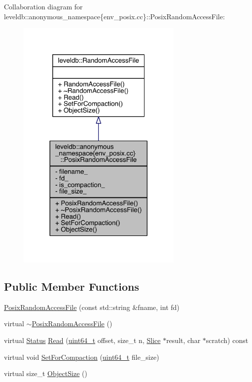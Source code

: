 Collaboration diagram for leveldb\+:\+:anonymous\+\_\+namespace\{env\+\_\+posix.\+cc\}\+:\+:Posix\+Random\+Access\+File\+:
\nopagebreak
\begin{figure}[H]
\begin{center}
\leavevmode
\includegraphics[width=228pt]{classleveldb_1_1anonymous__namespace_02env__posix_8cc_03_1_1_posix_random_access_file__coll__graph}
\end{center}
\end{figure}
\subsection*{Public Member Functions}
\begin{DoxyCompactItemize}
\item 
\hyperlink{classleveldb_1_1anonymous__namespace_02env__posix_8cc_03_1_1_posix_random_access_file_a59fbba60d64a0733967e370c0237144a}{Posix\+Random\+Access\+File} (const std\+::string \&fname, int fd)
\item 
virtual \hyperlink{classleveldb_1_1anonymous__namespace_02env__posix_8cc_03_1_1_posix_random_access_file_a679f35477f50752a92ed197fab3ca0bf}{$\sim$\+Posix\+Random\+Access\+File} ()
\item 
virtual \hyperlink{classleveldb_1_1_status}{Status} \hyperlink{classleveldb_1_1anonymous__namespace_02env__posix_8cc_03_1_1_posix_random_access_file_aca2f648930eefae81b23140cd69594c2}{Read} (\hyperlink{stdint_8h_aaa5d1cd013383c889537491c3cfd9aad}{uint64\+\_\+t} offset, size\+\_\+t n, \hyperlink{classleveldb_1_1_slice}{Slice} $\ast$result, char $\ast$scratch) const 
\item 
virtual void \hyperlink{classleveldb_1_1anonymous__namespace_02env__posix_8cc_03_1_1_posix_random_access_file_a9c28ba81aa49096f0722a78751807afd}{Set\+For\+Compaction} (\hyperlink{stdint_8h_aaa5d1cd013383c889537491c3cfd9aad}{uint64\+\_\+t} file\+\_\+size)
\item 
virtual size\+\_\+t \hyperlink{classleveldb_1_1anonymous__namespace_02env__posix_8cc_03_1_1_posix_random_access_file_a513a590d9fd72dc5812ab7dd8121cc5d}{Object\+Size} ()
\end{DoxyCompactItemize}
